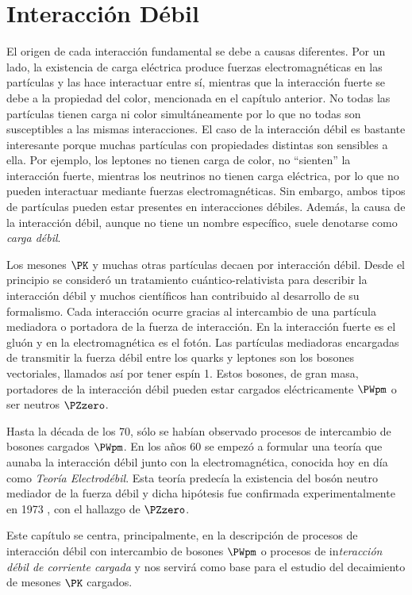 \chapter{Interacción Débil}\label{cap:weak_int}
El origen de cada interacción fundamental se debe a causas diferentes. Por un lado, la existencia de carga eléctrica produce fuerzas electromagnéticas en las partículas y las hace interactuar entre sí, mientras que la interacción fuerte se debe a la propiedad del color, mencionada en el capítulo anterior. No todas las partículas tienen carga ni color simultáneamente por lo que no todas son susceptibles a las mismas interacciones. El caso de la interacción débil es bastante interesante porque muchas partículas con propiedades distintas son sensibles a ella. Por ejemplo, los leptones no tienen carga de color, no ``sienten'' la interacción fuerte, mientras los neutrinos no tienen carga eléctrica, por lo que no pueden interactuar mediante fuerzas electromagnéticas. Sin embargo, ambos tipos de partículas pueden estar presentes en interacciones débiles.\cite{Griffiths2008} Además, la causa de la interacción débil, aunque no tiene un nombre específico, suele denotarse como \textit{carga débil}.

Los mesones $\PK$ y muchas otras partículas decaen por interacción débil. Desde el principio se consideró un tratamiento cuántico-relativista para describir la interacción débil y muchos científicos han contribuido al desarrollo de su formalismo. Cada interacción ocurre gracias al intercambio de una partícula mediadora o portadora de la fuerza de interacción. En la interacción fuerte es el gluón y en la electromagnética es el fotón. Las partículas mediadoras encargadas de transmitir la fuerza débil entre los quarks y leptones son los bosones vectoriales, llamados así por tener espín 1. Estos bosones, de gran masa, portadores de la interacción débil pueden estar cargados eléctricamente $\PWpm$ o ser neutros $\PZzero$. 

Hasta la década de los 70, sólo se habían observado procesos de intercambio de bosones cargados $\PWpm$. En los años 60 se empezó a formular una teoría que aunaba la interacción débil junto con la electromagnética, conocida hoy en día como \textit{Teoría Electrodébil}. Esta teoría predecía la existencia del bosón neutro mediador de la fuerza débil y dicha hipótesis fue confirmada experimentalmente en 1973 \cite{BrianM}, con el hallazgo de $\PZzero$.

Este capítulo se centra, principalmente, en la descripción de procesos de interacción débil con intercambio de bosones $\PWpm$ o procesos de in\textit{teracción débil de corriente cargada} y nos servirá como base para el estudio del decaimiento de mesones $\PK$ cargados.

